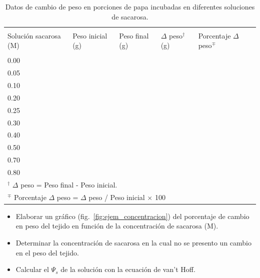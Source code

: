 \begin{table}[h!]
	\caption{Datos de cambio de peso en porciones de papa incubadas en diferentes soluciones de sacarosa.}
	
	\label{resultados:potencial}
	\centering
	\begin{tabular}{|p{}|p{}|p{}|p{}|p{}|}
	
	\hline  &&&& \\
	Soluci\'on sacarosa (M) & Peso inicial (g) & Peso final (g) & $\Delta$ peso$^\dagger$ (g) & Porcentaje $\Delta$ peso$^\mp$ \\
	&&&& \\
	\hline 
	0.00 &&&& \\
	0.05 &&&& \\
	0.10 &&&& \\
	0.20 &&&& \\
	0.25 &&&& \\
	0.30 &&&& \\
	0.40 &&&& \\
	0.50 &&&& \\
	0.70 &&&& \\
	0.80 &&&& \\

	\hline 

	\multicolumn{5}{l}{\footnotesize $^\dagger$ $\Delta$ peso = Peso final - Peso inicial. } \\
	\multicolumn{5}{l}{\footnotesize $^\mp$ Porcentaje $\Delta$ peso = $\Delta$ peso / Peso inicial $\times$ 100 }	
	
	\end{tabular}
\end{table}

\begin{itemize}
	\item Elaborar un gr\'afico (fig.~\ref{fig:ejem_concentracion}) del porcentaje de cambio en peso del tejido en funci\'on de la concentraci\'on de sacarosa (M).
	\item Determinar la concentraci\'on de sacarosa en la cual no se presento un cambio en el peso del tejido.
	\item Calcular el $\Psi_s$ de la soluci\'on con la ecuaci\'on de van't Hoff. 
\end{itemize}

